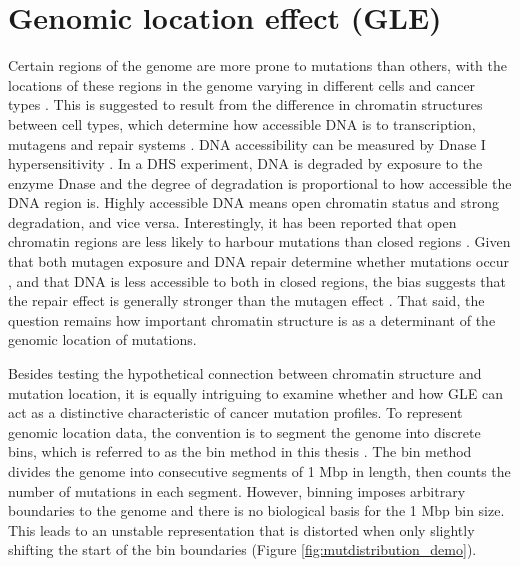\section{Genomic location effect (GLE)}
\label{intro:gle}
Certain regions of the genome are more prone to mutations than others, with the locations of these regions in the genome varying in different cells and cancer types \citep{Polak2015, Jiao2020}. This is suggested to result from the difference in chromatin structures between cell types, which determine how accessible DNA is to transcription, mutagens and repair systems \citep{Abascal2020ExpandedGenomes}. DNA accessibility can be measured by Dnase I hypersensitivity \citep[DHS;][]{Liu2019AApplications}. In a DHS experiment, DNA is degraded by exposure to the enzyme Dnase and the degree of degradation is proportional to how accessible the DNA region is. Highly accessible DNA means open chromatin status and strong degradation, and vice versa. Interestingly, it has been reported that open chromatin regions are less likely to harbour mutations than closed regions \citep{Polak2015,Prendergast2007ChromatinGenome}. Given that both \gls{mutagen} exposure and DNA repair determine whether mutations occur \citep{Ripley2001Mutation}, and that DNA is less accessible to both in closed regions, the bias suggests that the repair effect is generally stronger than the mutagen effect \citep[Figure \ref{fig:chromatin_demo};][]{Teng1997ExcisionSequences, Morse2002PhotoreactivationCerevisiae}. That said, the question remains how important chromatin structure is as a determinant of the genomic location of mutations. 



Besides testing the hypothetical connection between chromatin structure and mutation location, it is equally intriguing to examine whether and how GLE can act as a distinctive characteristic of cancer mutation profiles. To represent genomic location data, the convention is to segment the genome into discrete bins, which is referred to as the bin method in this thesis \citep{Kubler2019, Salvadores2019PassengerTumors, Chalmers2017AnalysisBurden, Salvadores2020MatchingPatterns}. The bin method divides the genome into consecutive segments of 1 Mbp in length, then counts the number of mutations in each segment. However, binning imposes arbitrary boundaries to the genome and there is no biological basis for the 1 Mbp bin size. This leads to an unstable representation that is distorted when only slightly shifting the start of the bin boundaries (Figure \ref{fig:mutdistribution_demo}). 


